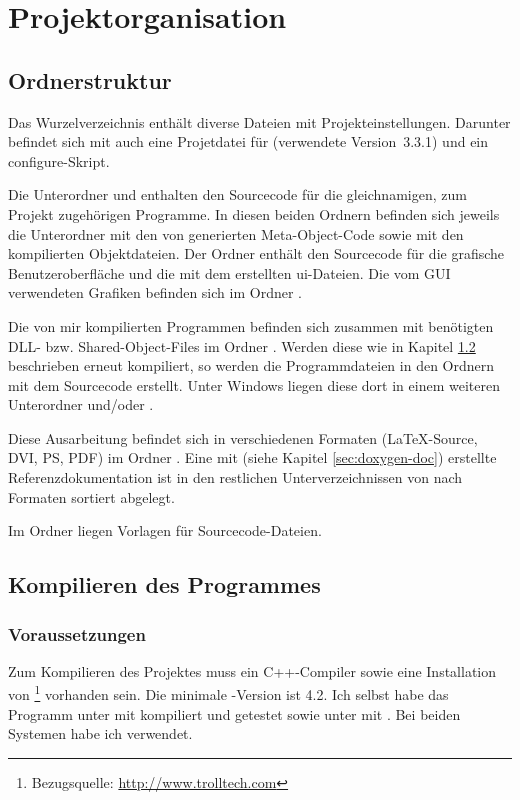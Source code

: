 \chapter{Projektorganisation}

\section{Ordnerstruktur}
Das Wurzelverzeichnis enthält diverse Dateien mit Projekteinstellungen. Darunter befindet sich mit  auch eine Projetdatei für  (verwendete Version~3.3.1) und ein configure-Skript.

Die Unterordner  und  enthalten den Sourcecode für die gleichnamigen, zum Projekt zugehörigen Programme. In diesen beiden Ordnern befinden sich jeweils die Unterordner  mit den von  generierten Meta-Object-Code sowie  mit den kompilierten Objektdateien. Der Ordner  enthält den Sourcecode für die grafische Benutzeroberfläche und die mit dem  erstellten ui-Dateien. Die vom GUI verwendeten Grafiken befinden sich im Ordner .

Die von mir kompilierten Programmen befinden sich zusammen mit benötigten DLL- bzw. Shared-Object-Files im Ordner . Werden diese wie in Kapitel \ref{sec:compile} beschrieben erneut kompiliert, so werden die Programmdateien in den Ordnern mit dem Sourcecode erstellt. Unter Windows liegen diese dort in einem weiteren Unterordner  und/oder .

Diese Ausarbeitung befindet sich in verschiedenen Formaten (\LaTeX-Source, DVI, PS, PDF) im Ordner . Eine mit  (siehe Kapitel \ref{sec:doxygen-doc}) erstellte Referenzdokumentation ist in den restlichen Unterverzeichnissen von  nach Formaten sortiert abgelegt.

Im Ordner  liegen Vorlagen für Sourcecode-Dateien.

\section{Kompilieren des Programmes} \label{sec:compile}
\subsection{Voraussetzungen}
Zum Kompilieren des Projektes muss ein C++-Compiler sowie eine Installation von \footnote{Bezugsquelle: \url{http://www.trolltech.com}} vorhanden sein. Die minimale -Version ist 4.2. Ich selbst habe das Programm unter  mit  kompiliert und getestet sowie unter  mit . Bei beiden Systemen habe ich  verwendet.

